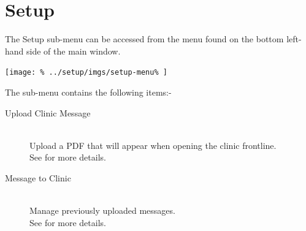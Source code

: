 \documentclass[../main/main]{subfiles}
\begin{document}
\newpage
\chapter{Setup}
The Setup sub-menu can be accessed from the menu found on the bottom
left-hand side of the main window.

\texttt{[image: \%
  ../setup/imgs/setup-menu\%
]}

The sub-menu contains the following items:-
\begin{description}
\item[Upload Clinic Message] \hfill \\
Upload a PDF that will appear when opening the clinic frontline.\\
See  for more details.
\item[Message to Clinic] \hfill \\
Manage previously uploaded messages.\\
See  for more details.
\end{description}



\end{document}
